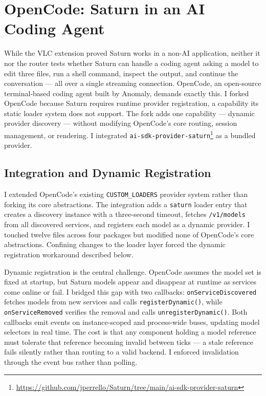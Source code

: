 \section{OpenCode: Saturn in an AI Coding Agent}
\label{sec:opencode-implementation}

While the VLC extension proved Saturn works in a non-AI application, neither it nor the router tests whether Saturn can handle a coding agent asking a model to edit three files, run a shell command, inspect the output, and continue the conversation --- all over a single streaming connection. OpenCode, an open-source terminal-based coding agent built by Anomaly, demands exactly this.
I forked OpenCode because Saturn requires runtime provider registration, a capability its static loader system does not support. The fork adds one capability --- dynamic provider discovery --- without modifying OpenCode's core routing, session management, or rendering. I integrated \texttt{ai-sdk-provider-saturn}\footnote{\url{https://github.com/jperrello/Saturn/tree/main/ai-sdk-provider-saturn}} as a bundled provider.

\subsection{Integration and Dynamic Registration}

I extended OpenCode's existing \texttt{CUSTOM\_LOADERS} provider system rather than forking its core abstractions.
The integration adds a \texttt{saturn} loader entry that creates a discovery instance with a three-second timeout, fetches \texttt{/v1/models} from all discovered services, and registers each model as a dynamic provider.
I touched twelve files across four packages but modified none of OpenCode's core abstractions. Confining changes to the loader layer forced the dynamic registration workaround described below.

Dynamic registration is the central challenge. OpenCode assumes the model set is fixed at startup, but Saturn models appear and disappear at runtime as services come online or fail. I bridged this gap with two callbacks: \texttt{onServiceDiscovered} fetches models from new services and calls \texttt{registerDynamic()}, while \texttt{onServiceRemoved} verifies the removal and calls \texttt{unregisterDynamic()}. Both callbacks emit events on instance-scoped and process-wide buses, updating model selectors in real time. The cost is that any component holding a model reference must tolerate that reference becoming invalid between ticks --- a stale reference fails silently rather than routing to a valid backend. I enforced invalidation through the event bus rather than polling.

